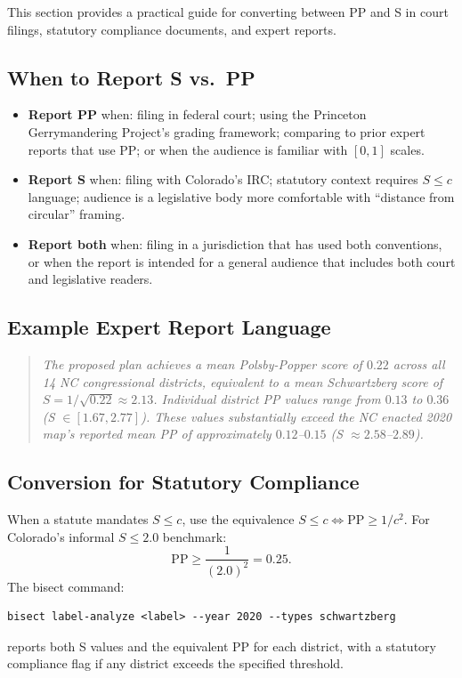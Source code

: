 This section provides a practical guide for converting between PP and S in
court filings, statutory compliance documents, and expert reports.

\subsection{When to Report S vs.\ PP}

\begin{itemize}
  \item \textbf{Report PP} when: filing in federal court; using the Princeton
    Gerrymandering Project's grading framework; comparing to prior expert reports
    that use PP; or when the audience is familiar with $[0,1]$ scales.
  \item \textbf{Report S} when: filing with Colorado's IRC; statutory context
    requires $S \leq c$ language; audience is a legislative body more comfortable
    with ``distance from circular'' framing.
  \item \textbf{Report both} when: filing in a jurisdiction that has used both
    conventions, or when the report is intended for a general audience that
    includes both court and legislative readers.
\end{itemize}

\subsection{Example Expert Report Language}

\begin{quote}
  \emph{The proposed plan achieves a mean Polsby-Popper score of $0.22$ across
  all 14 NC congressional districts, equivalent to a mean Schwartzberg score of
  $S = 1/\sqrt{0.22} \approx 2.13$. Individual district PP values range from
  $0.13$ to $0.36$ (S $\in [1.67, 2.77]$). These values substantially exceed
  the NC enacted 2020 map's reported mean PP of approximately $0.12$--$0.15$
  (S $\approx 2.58$--$2.89$).}
\end{quote}

\subsection{Conversion for Statutory Compliance}

When a statute mandates $S \leq c$, use the equivalence $S \leq c \Leftrightarrow \text{PP} \geq 1/c^2$.
For Colorado's informal $S \leq 2.0$ benchmark:
\[
  \text{PP} \geq \frac{1}{(2.0)^2} = 0.25.
\]
The bisect command:
\begin{verbatim}
bisect label-analyze <label> --year 2020 --types schwartzberg
\end{verbatim}
reports both S values and the equivalent PP for each district,
with a statutory compliance flag if any district exceeds the specified threshold.
